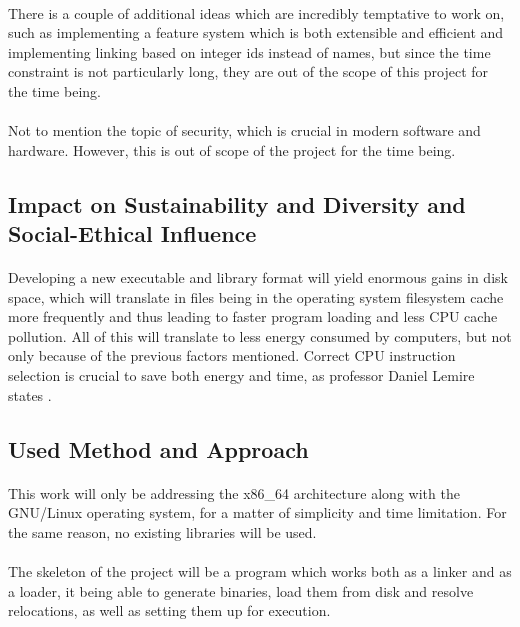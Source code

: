\documentclass[12pt]{article}
\begin{document}
	\paragraph{} There is a couple of additional ideas which are incredibly temptative to work on, such as implementing a feature system which is both extensible and efficient and implementing linking based on integer ids instead of names, but since the time constraint is not particularly long, they are out of the scope of this project for the time being.
	\paragraph{}Not to mention the topic of security, which is crucial in modern software and hardware. However, this is out of scope of the project for the time being.
	\subsection{Impact on Sustainability and Diversity and Social-Ethical Influence}
    \paragraph{} Developing a new executable and library format will yield enormous gains in disk space, which will translate in files being in the operating system filesystem cache more frequently and thus leading to faster program loading and less CPU cache pollution. All of this will translate to less energy consumed by computers, but not only because of the previous factors mentioned. Correct CPU instruction selection is crucial to save both energy and time, as professor Daniel Lemire states \cite{lemire-energy}. 
	\subsection{Used Method and Approach}
	\paragraph{}This work will only be addressing the x86\_64 architecture along with the GNU/Linux operating system, for a matter of simplicity and time limitation. For the same reason, no existing libraries will be used.
    
    \paragraph{}The skeleton of the project will be a program which works both as a linker and as a loader, it being able to generate binaries, load them from disk and resolve relocations, as well as setting them up for execution.
    
\end{document}
